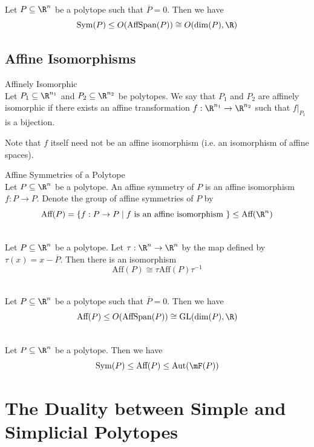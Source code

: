 \documentclass[a4paper]{article}
\begin{document}
\begin{prp}{}{}\\
Let $P\subseteq\R^n$ be a polytope such that $\overline{P}=0$. Then we have $$\text{Sym}(P)\leq O(\text{AffSpan}(P))\cong O(\dim(P),\R)$$
\end{prp}

\subsection{Affine Isomorphisms}
\begin{defn}{Affinely Isomorphic}{}\\
Let $P_1\subseteq\R^{n_1}$ and $P_2\subseteq\R^{n_2}$ be polytopes. We say that $P_1$ and $P_2$ are affinely isomorphic if there exists an affine transformation $f:\R^{n_1}\to\R^{n_2}$ such that $f|_{P_1}$ is a bijection. 
\end{defn}

Note that $f$ itself need not be an affine isomorphism (i.e. an isomorphism of affine spaces). 

\begin{defn}{Affine Symmetries of a Polytope}{}\\
Let $P\subseteq\R^n$ be a polytope. An affine symmetry of $P$ is an affine isomorphism $f:P\to P$. Denote the group of affine symmetries of $P$ by $$\text{Aff}(P)=\{f:P\to P\;|\;f\text{ is an affine isomorphism }\}\leq\text{Aff}(\R^n)$$
\end{defn}

\begin{prp}{}{}\\
Let $P\subseteq\R^n$ be a polytope. Let $\tau:\R^n\to\R^n$ by the map defined by $\tau(x)=x-\overline{P}$. Then there is an isomorphism $$\text{Aff}(P)\cong\tau\text{Aff}(P)\tau^{-1}$$
\end{prp}

\begin{prp}{}{}\\
Let $P\subseteq\R^n$ be a polytope such that $\overline{P}=0$. Then we have $$\text{Aff}(P)\leq O(\text{AffSpan}(P))\cong\text{GL}(\dim(P),\R)$$
\end{prp}

\begin{prp}{}{}\\
Let $P\subseteq\R^n$ be a polytope. Then we have $$\text{Sym}(P)\leq\text{Aff}(P)\leq\text{Aut}(\mF(P))$$
\end{prp}

\pagebreak
\section{The Duality between Simple and Simplicial Polytopes}
\end{document}
